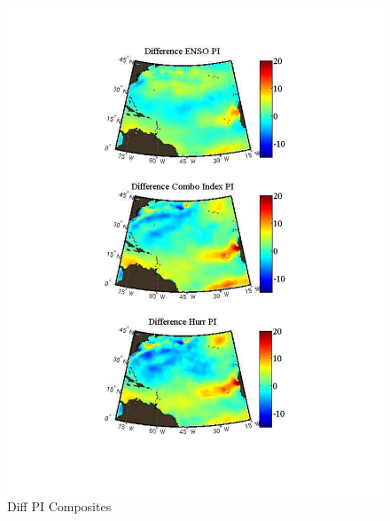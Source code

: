 \documentclass[]{article}
\begin{document}
\begin{figure}[ht]
\begin{minipage}[b]{0.55\linewidth}
\includegraphics[width=\textwidth]{figures/comboIndex/composites/compareMDRCompositesPI.pdf}
\caption{Diff PI Composites}
\label{fig:figure22}
\end{minipage}
\end{figure}
\end{document}
